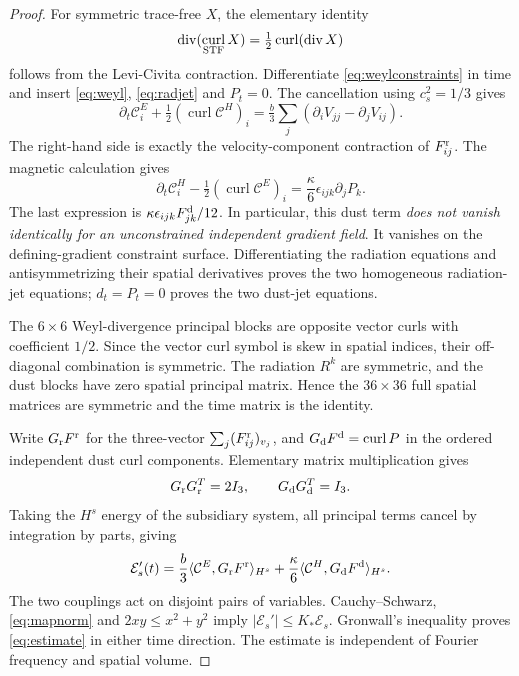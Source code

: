 \documentclass[10pt,a4paper]{article}
\DeclareMathOperator{\divg}{div}
\DeclareMathOperator{\curl}{curl}
\newcommand{\cE}{\mathcal C^{E}}
\newcommand{\cH}{\mathcal C^{H}}
\newcommand{\kgr}{\kappa}
\begin{document}
\begin{proof}
For symmetric trace-free $X$, the elementary identity
\begin{equation}\label{eq:curlidentity}
\divg(\curl_{\rm STF}X)=\tfrac12\curl(\divg X)
\end{equation}
follows from the Levi-Civita contraction. Differentiate \eqref{eq:weylconstraints} in time and insert \eqref{eq:weyl}, \eqref{eq:radjet} and $P_t=0$. The cancellation using $c_s^2=1/3$ gives
\[
\partial_t\cE_i+\tfrac12(\curl\cH)_i
=\tfrac b3\sum_j(\partial_iV_{jj}-\partial_jV_{ij}).
\]
The right-hand side is exactly the velocity-component contraction of $F^{\rm r}_{ij}$. The magnetic calculation gives
\[
\partial_t\cH_i-\tfrac12(\curl\cE)_i
=\frac{\kgr}{6}\epsilon_{ijk}\partial_jP_k.
\]
The last expression is $\kgr\epsilon_{ijk}F^{\rm d}_{jk}/12$. In particular, this dust term \emph{does not vanish identically for an unconstrained independent gradient field}. It vanishes on the defining-gradient constraint surface. Differentiating the radiation equations and antisymmetrizing their spatial derivatives proves the two homogeneous radiation-jet equations; $d_t=P_t=0$ proves the two dust-jet equations.

The $6\times6$ Weyl-divergence principal blocks are opposite vector curls with coefficient $1/2$. Since the vector curl symbol is skew in spatial indices, their off-diagonal combination is symmetric. The radiation $R^k$ are symmetric, and the dust blocks have zero spatial principal matrix. Hence the $36\times36$ full spatial matrices are symmetric and the time matrix is the identity.

Write $G_{\rm r}F^{\rm r}$ for the three-vector $\sum_j(F^{\rm r}_{ij})_{v_j}$, and $G_{\rm d}F^{\rm d}=\curl P$ in the ordered independent dust curl components. Elementary matrix multiplication gives
\begin{equation}\label{eq:mapnorm}
G_{\rm r}G_{\rm r}^{T}=2I_3,
\qquad G_{\rm d}G_{\rm d}^{T}=I_3.
\end{equation}
Taking the $H^s$ energy of the subsidiary system, all principal terms cancel by integration by parts, giving
\[
\mathcal E_s'(t)=\frac b3\langle\cE,G_{\rm r}F^{\rm r}\rangle_{H^s}
+\frac{\kgr}{6}\langle\cH,G_{\rm d}F^{\rm d}\rangle_{H^s}.
\]
The two couplings act on disjoint pairs of variables. Cauchy--Schwarz, \eqref{eq:mapnorm} and $2xy\le x^2+y^2$ imply $|\mathcal E_s'|\le K_*\mathcal E_s$. Gronwall's inequality proves \eqref{eq:estimate} in either time direction. The estimate is independent of Fourier frequency and spatial volume.
\end{proof}
\end{document}
